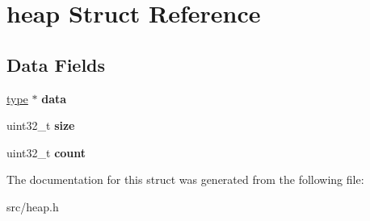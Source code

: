 \hypertarget{structheap}{}\section{heap Struct Reference}
\label{structheap}
\subsection*{Data Fields}
\begin{DoxyCompactItemize}
\item 
\hyperlink{structtree__node}{type} $\ast$ {\bfseries data}\hypertarget{structheap_a3ac2b26eb195f5b19d5e07001fd9af58}{}\label{structheap_a3ac2b26eb195f5b19d5e07001fd9af58}

\item 
uint32\+\_\+t {\bfseries size}\hypertarget{structheap_ab2c6b258f02add8fdf4cfc7c371dd772}{}\label{structheap_ab2c6b258f02add8fdf4cfc7c371dd772}

\item 
uint32\+\_\+t {\bfseries count}\hypertarget{structheap_a86988a65e0d3ece7990c032c159786d6}{}\label{structheap_a86988a65e0d3ece7990c032c159786d6}

\end{DoxyCompactItemize}


The documentation for this struct was generated from the following file\+:\begin{DoxyCompactItemize}
\item 
src/heap.\+h\end{DoxyCompactItemize}
